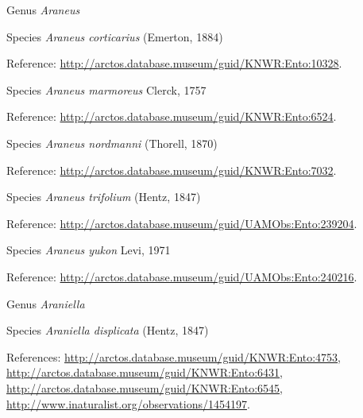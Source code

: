 \documentclass[9pt, article]{memoir}
\begin{document}
\begin{multicols}{2}
\vspace{6pt}\noindent\hspace{30pt}Genus \textit{Araneus}


\vspace{6pt}\noindent\hspace{36pt}Species \textit{Araneus corticarius} (Emerton, 1884)


\vspace{6pt}Reference: 
\url{http://arctos.database.museum/guid/KNWR:Ento:10328}.

\vspace{6pt}\noindent\hspace{36pt}Species \textit{Araneus marmoreus} Clerck, 1757


\vspace{6pt}Reference: 
\url{http://arctos.database.museum/guid/KNWR:Ento:6524}.

\vspace{6pt}\noindent\hspace{36pt}Species \textit{Araneus nordmanni} (Thorell, 1870)


\vspace{6pt}Reference: 
\url{http://arctos.database.museum/guid/KNWR:Ento:7032}.

\vspace{6pt}\noindent\hspace{36pt}Species \textit{Araneus trifolium} (Hentz, 1847)


\vspace{6pt}Reference: 
\url{http://arctos.database.museum/guid/UAMObs:Ento:239204}.

\vspace{6pt}\noindent\hspace{36pt}Species \textit{Araneus yukon} Levi, 1971


\vspace{6pt}Reference: 
\url{http://arctos.database.museum/guid/UAMObs:Ento:240216}.

\vspace{6pt}\noindent\hspace{30pt}Genus \textit{Araniella}


\vspace{6pt}\noindent\hspace{36pt}Species \textit{Araniella displicata} (Hentz, 1847)


\vspace{6pt}References: 
\url{http://arctos.database.museum/guid/KNWR:Ento:4753}, 
\url{http://arctos.database.museum/guid/KNWR:Ento:6431}, 
\url{http://arctos.database.museum/guid/KNWR:Ento:6545}, 
\url{http://www.inaturalist.org/observations/1454197}.


\end{multicols}
\end{document}
